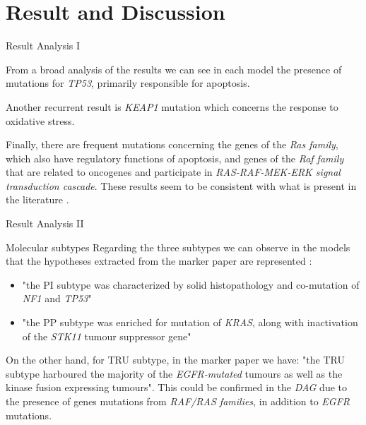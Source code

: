 \documentclass{beamer}
\begin{document}
\section{Result and Discussion}
\begin{frame}{Result Analysis I}
  \begin{block}{}
    From a broad analysis of the results we can see in each model the presence
    of mutations for \textit{TP53}, primarily responsible for apoptosis. 
  \end{block}
  \pause
  \begin{block}{}
    Another recurrent result is \textit{KEAP1} mutation which concerns the
    response to oxidative stress. 
  \end{block}
  \pause
  \begin{block}{}
    Finally, there are frequent mutations concerning the genes of the
    \textit{Ras family}, which also have regulatory functions of apoptosis, and
    genes of the \textit{Raf family} that are related to oncogenes and
    participate in \textit{RAS-RAF-MEK-ERK signal transduction cascade}. These
    results seem to be consistent with what is present in the literature
    \cite{rasl}. 
  \end{block}
\end{frame}
\begin{frame}{Result Analysis II}
  \begin{block}{Molecular subtypes}
    Regarding the three subtypes we can observe in the models that the
    hypotheses extracted from the marker paper are represented
    \cite{luadmarker}: 
    \begin{itemize}
      \item "the PI subtype was characterized by solid histopathology and
      co-mutation of \textit{NF1} and \textit{TP53}" 
      \item "the PP subtype was enriched for mutation of \textit{KRAS}, along
      with inactivation of the \textit{STK11} tumour suppressor gene" 
    \end{itemize}
    On the other hand, for TRU subtype, in the marker paper we have: "the TRU
    subtype harboured the majority of the \textit{EGFR-mutated} tumours as well
    as the kinase fusion expressing tumours". This could be confirmed in the
    \textit{DAG} due to the presence of genes mutations from \textit{RAF/RAS
      families}, in addition to \textit{EGFR} mutations. 
  \end{block}
\end{frame}
\end{document}
